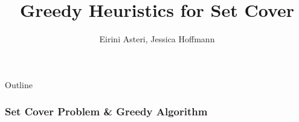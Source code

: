 \documentclass{beamer}
\title[Your Short Title]{Greedy Heuristics for Set Cover}
\author{Eirini Asteri, Jessica Hoffmann}
\institute{University of Texas, Austin}
\date{}
\begin{document}
\begin{frame}
  \titlepage
\end{frame}

\begin{frame}{Outline}
  \tableofcontents
\end{frame}

\begin{frame}
\frametitle{Set Cover Problem \& Greedy Algorithm}
\begin{minipage}{0.45\textwidth}
\begin{overlayarea}{\textwidth}{0.5\textheight}
% 
% 

\end{overlayarea}
\end{minipage}
\end{frame}
\end{document}

